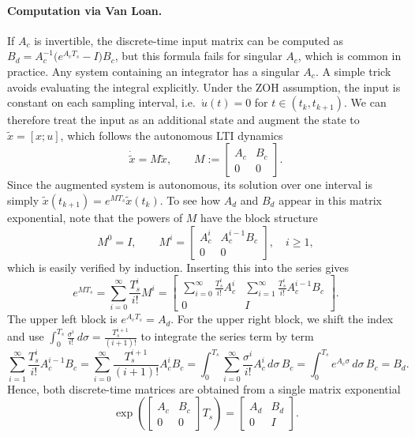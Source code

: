 \paragraph{Computation via Van Loan.}
If $A_c$ is invertible, the discrete-time input matrix can be computed as $B_d = A_c^{-1} \big( e^{A_c T_s} - I \big) B_c$, but this formula fails for singular $A_c$, which is common in practice.
Any system containing an integrator has a singular $A_c$.
A simple trick~\cite{van1978computing} avoids evaluating the integral explicitly.
Under the ZOH assumption, the input is constant on each sampling interval, i.e.\ $\dot{u}(t) = 0$ for $t \in (t_k, t_{k+1})$.
We can therefore treat the input as an additional state and augment the state to $\tilde{x} = [x; u]$, which follows the autonomous LTI dynamics
\[
\dot{\tilde{x}} = M \tilde{x},
\qquad
M :=
\begin{bmatrix}
    A_c & B_c \\
    0   & 0
\end{bmatrix}.
\]
Since the augmented system is autonomous, its solution over one interval is simply $\tilde{x}(t_{k+1}) = e^{M T_s} \tilde{x}(t_k)$.
To see how $A_d$ and $B_d$ appear in this matrix exponential, note that the powers of $M$ have the block structure
\[
M^0 = I,
\qquad
M^i =
\begin{bmatrix}
    A_c^i & A_c^{i-1} B_c \\
    0     & 0
\end{bmatrix},
\quad i \geq 1,
\]
which is easily verified by induction.
Inserting this into the series gives
\[
e^{M T_s} = \sum_{i=0}^{\infty} \frac{T_s^i}{i!} M^i =
\begin{bmatrix}
    \sum_{i=0}^{\infty} \frac{T_s^i}{i!} A_c^i & \sum_{i=1}^{\infty} \frac{T_s^i}{i!} A_c^{i-1} B_c \\
    0 & I
\end{bmatrix}.
\]
The upper left block is $e^{A_c T_s} = A_d$.
For the upper right block, we shift the index and use $\int_0^{T_s} \frac{\sigma^i}{i!} \, d\sigma = \frac{T_s^{i+1}}{(i+1)!}$ to integrate the series term by term
\[
\sum_{i=1}^{\infty} \frac{T_s^i}{i!} A_c^{i-1} B_c
= \sum_{i=0}^{\infty} \frac{T_s^{i+1}}{(i+1)!} A_c^{i} B_c
= \int_0^{T_s} \sum_{i=0}^{\infty} \frac{\sigma^i}{i!} A_c^{i} \, d\sigma \, B_c
= \int_0^{T_s} e^{A_c \sigma} \, d\sigma \, B_c
= B_d.
\]
Hence, both discrete-time matrices are obtained from a single matrix exponential
\begin{equation} \label{eq:zoh_expm}
\exp\left(
\begin{bmatrix}
    A_c & B_c \\
    0   & 0
\end{bmatrix}
T_s
\right)
=
\begin{bmatrix}
    A_d & B_d \\
    0   & I
\end{bmatrix}.
\end{equation}
